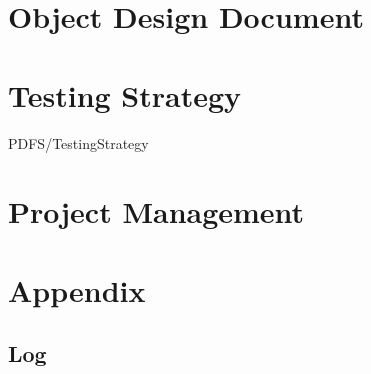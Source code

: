 \documentclass{article}
\begin{document}
\section{Object Design Document}
	
\section{Testing Strategy}
	 {PDFS/TestingStrategy}
\section{Project Management}
	

\section{Appendix}
\subsection{Log}
	
\end{document}
